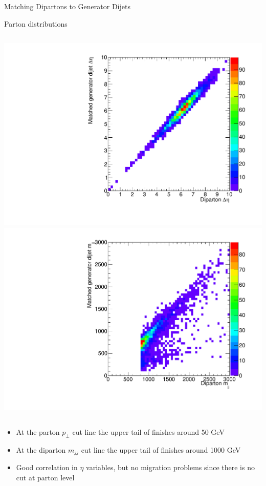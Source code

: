 \documentclass[8pt]{beamer}
\begin{document}
\begin{frame}{Matching Dipartons to Generator Dijets}
\begin{block}{Parton distributions}
\begin{columns}
  \centering
  \includegraphics[width=0.8\linewidth]{img/SelDiParton_MatchedGenJet_DEta.pdf} \\
  \includegraphics[width=0.8\linewidth]{img/SelDiParton_MatchedGenJet_Mjj.pdf}

\end{columns}
  
\end{block}

\begin{itemize}
  \item At the parton  $p_\perp$ cut line the upper tail of finishes around 50 GeV 
  \item At the diparton $m_{jj}$ cut line the upper tail of finishes around 1000 GeV    
  \item Good correlation in $\eta$ variables, but no migration problems since there is no cut at parton level
\end{itemize}


\end{frame}
\end{document}
